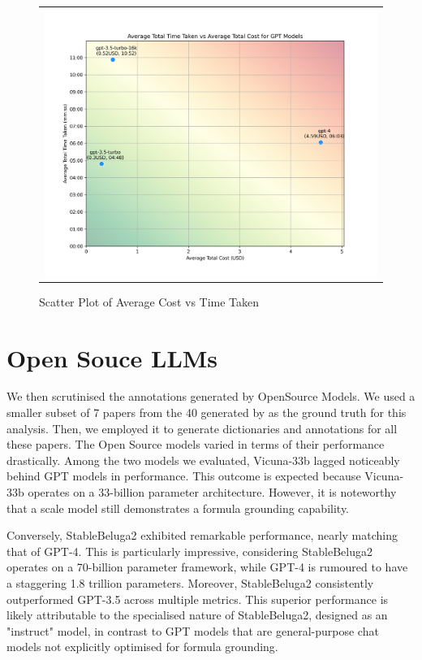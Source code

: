 \begin{figure}[htpb]
  \centering
  \begin{tabular}{c}
  \includegraphics[width=14cm]{images/gpt-time-v-cost.png}
  \end{tabular}
  \caption[Cost vs Time]{Scatter Plot of Average Cost vs Time Taken}\label{fig:gpt-time-v-cost}
\end{figure}


\section{Open Souce LLMs}

We then scrutinised the annotations generated by OpenSource Models. We used a smaller subset of 7 papers from the 40 generated by \citet{asakura2022building} as the ground truth for this analysis. Then, we employed it to generate dictionaries and annotations for all these papers. The Open Source models varied in terms of their performance drastically. Among the two models we evaluated, Vicuna-33b lagged noticeably behind GPT models in performance. This outcome is expected because Vicuna-33b operates on a 33-billion parameter architecture. However, it is noteworthy that a scale model still demonstrates a formula grounding capability.

Conversely, StableBeluga2 exhibited remarkable performance, nearly matching that of GPT-4. This is particularly impressive, considering StableBeluga2 operates on a 70-billion parameter framework, while GPT-4 is rumoured to have a staggering 1.8 trillion parameters. Moreover, StableBeluga2 consistently outperformed GPT-3.5 across multiple metrics. This superior performance is likely attributable to the specialised nature of StableBeluga2, designed as an "instruct" model, in contrast to GPT models that are general-purpose chat models not explicitly optimised for formula grounding.

